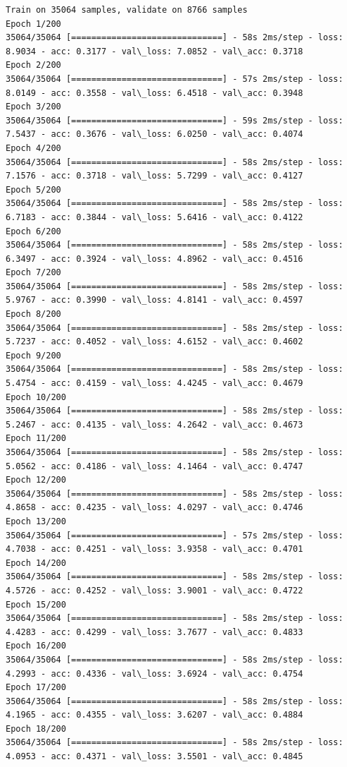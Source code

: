 \documentclass[11pt]{article}
\begin{document}
    \begin{Verbatim}[commandchars=\\\{\}]
Train on 35064 samples, validate on 8766 samples
Epoch 1/200
35064/35064 [==============================] - 58s 2ms/step - loss: 8.9034 - acc: 0.3177 - val\_loss: 7.0852 - val\_acc: 0.3718
Epoch 2/200
35064/35064 [==============================] - 57s 2ms/step - loss: 8.0149 - acc: 0.3558 - val\_loss: 6.4518 - val\_acc: 0.3948
Epoch 3/200
35064/35064 [==============================] - 59s 2ms/step - loss: 7.5437 - acc: 0.3676 - val\_loss: 6.0250 - val\_acc: 0.4074
Epoch 4/200
35064/35064 [==============================] - 58s 2ms/step - loss: 7.1576 - acc: 0.3718 - val\_loss: 5.7299 - val\_acc: 0.4127
Epoch 5/200
35064/35064 [==============================] - 58s 2ms/step - loss: 6.7183 - acc: 0.3844 - val\_loss: 5.6416 - val\_acc: 0.4122
Epoch 6/200
35064/35064 [==============================] - 58s 2ms/step - loss: 6.3497 - acc: 0.3924 - val\_loss: 4.8962 - val\_acc: 0.4516
Epoch 7/200
35064/35064 [==============================] - 58s 2ms/step - loss: 5.9767 - acc: 0.3990 - val\_loss: 4.8141 - val\_acc: 0.4597
Epoch 8/200
35064/35064 [==============================] - 58s 2ms/step - loss: 5.7237 - acc: 0.4052 - val\_loss: 4.6152 - val\_acc: 0.4602
Epoch 9/200
35064/35064 [==============================] - 58s 2ms/step - loss: 5.4754 - acc: 0.4159 - val\_loss: 4.4245 - val\_acc: 0.4679
Epoch 10/200
35064/35064 [==============================] - 58s 2ms/step - loss: 5.2467 - acc: 0.4135 - val\_loss: 4.2642 - val\_acc: 0.4673
Epoch 11/200
35064/35064 [==============================] - 58s 2ms/step - loss: 5.0562 - acc: 0.4186 - val\_loss: 4.1464 - val\_acc: 0.4747
Epoch 12/200
35064/35064 [==============================] - 58s 2ms/step - loss: 4.8658 - acc: 0.4235 - val\_loss: 4.0297 - val\_acc: 0.4746
Epoch 13/200
35064/35064 [==============================] - 57s 2ms/step - loss: 4.7038 - acc: 0.4251 - val\_loss: 3.9358 - val\_acc: 0.4701
Epoch 14/200
35064/35064 [==============================] - 58s 2ms/step - loss: 4.5726 - acc: 0.4252 - val\_loss: 3.9001 - val\_acc: 0.4722
Epoch 15/200
35064/35064 [==============================] - 58s 2ms/step - loss: 4.4283 - acc: 0.4299 - val\_loss: 3.7677 - val\_acc: 0.4833
Epoch 16/200
35064/35064 [==============================] - 58s 2ms/step - loss: 4.2993 - acc: 0.4336 - val\_loss: 3.6924 - val\_acc: 0.4754
Epoch 17/200
35064/35064 [==============================] - 58s 2ms/step - loss: 4.1965 - acc: 0.4355 - val\_loss: 3.6207 - val\_acc: 0.4884
Epoch 18/200
35064/35064 [==============================] - 58s 2ms/step - loss: 4.0953 - acc: 0.4371 - val\_loss: 3.5501 - val\_acc: 0.4845

\end{Verbatim}
\end{document}
